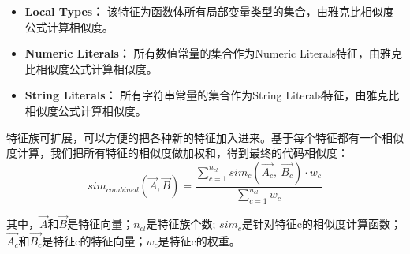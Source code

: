 \begin{itemize}
	
	\item \textbf{Local Types：} 该特征为函数体所有局部变量类型的集合，由雅克比相似度公式计算相似度。
	\item \textbf{Numeric Literals：} 所有数值常量的集合作为Numeric Literals特征，由雅克比相似度公式计算相似度。
	\item \textbf{String Literals：} 所有字符串常量的集合作为String Literals特征，由雅克比相似度公式计算相似度。
\end{itemize}

特征族可扩展，可以方便的把各种新的特征加入进来。基于每个特征都有一个相似度计算，我们把所有特征的相似度做加权和，得到最终的代码相似度：
\begin{equation}
	sim_{combined}(\vec{A},\vec{B})=\frac{\sum_{c=1}^{n_{cl}}sim_{c}(\vec{A_c},~\vec{B_c})\cdot w_{c}}{\sum_{c=1}^{n_{cl}}w_{c}}
\end{equation}

其中，$\vec{A}$和$\vec{B}$是特征向量；$n_{cl}$是特征族个数; $sim_{c}$是针对特征c的相似度计算函数；$\vec{A_c}$和$\vec{B_c}$是特征c的特征向量；$w_{c}$是特征c的权重。